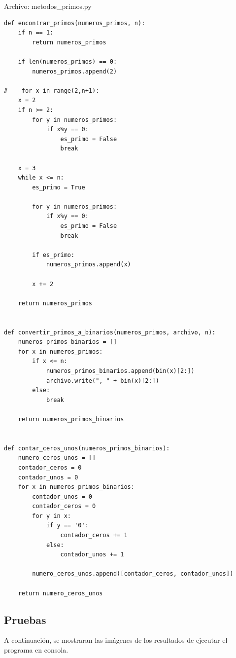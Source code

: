 \documentclass[12pt]{article}
\begin{document}
\vspace{1em}

Archivo: metodos\_primos.py
\lstset{language=Python, breaklines=true, basicstyle=\footnotesize}
\begin{lstlisting}[frame=single]
def encontrar_primos(numeros_primos, n):
    if n == 1:
        return numeros_primos

    if len(numeros_primos) == 0:
        numeros_primos.append(2)

#    for x in range(2,n+1):
    x = 2
    if n >= 2:
        for y in numeros_primos:
            if x%y == 0:
                es_primo = False
                break

    x = 3
    while x <= n:
        es_primo = True

        for y in numeros_primos:
            if x%y == 0:
                es_primo = False
                break

        if es_primo:
            numeros_primos.append(x)

        x += 2

    return numeros_primos


def convertir_primos_a_binarios(numeros_primos, archivo, n):
    numeros_primos_binarios = []
    for x in numeros_primos:
        if x <= n:
            numeros_primos_binarios.append(bin(x)[2:])
            archivo.write(", " + bin(x)[2:])
        else:
            break

    return numeros_primos_binarios


def contar_ceros_unos(numeros_primos_binarios):
    numero_ceros_unos = []
    contador_ceros = 0
    contador_unos = 0
    for x in numeros_primos_binarios:
        contador_unos = 0
        contador_ceros = 0
        for y in x:
            if y == '0':
                contador_ceros += 1
            else:
                contador_unos += 1

        numero_ceros_unos.append([contador_ceros, contador_unos])

    return numero_ceros_unos
\end{lstlisting}

\newpage

\subsection{Pruebas}
A continuación, se mostraran las imágenes de los resultados de ejecutar el programa en consola.\\
\end{document}
